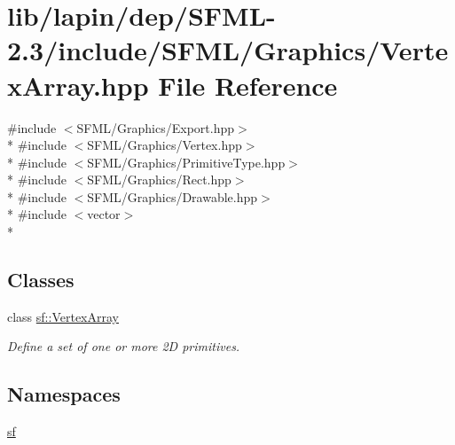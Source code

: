 \hypertarget{lapin_2dep_2_s_f_m_l-2_83_2include_2_s_f_m_l_2_graphics_2_vertex_array_8hpp}{\section{lib/lapin/dep/\-S\-F\-M\-L-\/2.3/include/\-S\-F\-M\-L/\-Graphics/\-Vertex\-Array.hpp File Reference}
\label{lapin_2dep_2_s_f_m_l-2_83_2include_2_s_f_m_l_2_graphics_2_vertex_array_8hpp}
}
{\ttfamily \#include $<$S\-F\-M\-L/\-Graphics/\-Export.\-hpp$>$}\\*
{\ttfamily \#include $<$S\-F\-M\-L/\-Graphics/\-Vertex.\-hpp$>$}\\*
{\ttfamily \#include $<$S\-F\-M\-L/\-Graphics/\-Primitive\-Type.\-hpp$>$}\\*
{\ttfamily \#include $<$S\-F\-M\-L/\-Graphics/\-Rect.\-hpp$>$}\\*
{\ttfamily \#include $<$S\-F\-M\-L/\-Graphics/\-Drawable.\-hpp$>$}\\*
{\ttfamily \#include $<$vector$>$}\\*
\subsection*{Classes}
\begin{DoxyCompactItemize}
\item 
class \hyperlink{classsf_1_1_vertex_array}{sf\-::\-Vertex\-Array}
\begin{DoxyCompactList}\small\item\em Define a set of one or more 2\-D primitives. \end{DoxyCompactList}\end{DoxyCompactItemize}
\subsection*{Namespaces}
\begin{DoxyCompactItemize}
\item 
\hyperlink{namespacesf}{sf}
\end{DoxyCompactItemize}
